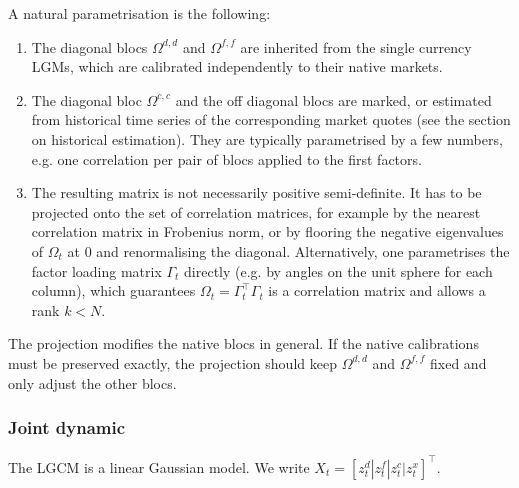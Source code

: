 \documentclass[11pt,english]{amsart}
\theoremstyle{definition}
\begin{document}
A natural parametrisation is the following:
\begin{enumerate}
\item The diagonal blocs $\Omega^{d,d}$ and $\Omega^{f,f}$ are inherited from the single currency LGMs, which are calibrated independently to their native markets.
\item The diagonal bloc $\Omega^{c,c}$ and the off diagonal blocs are marked, or estimated from historical time series of the corresponding market quotes (see the section on historical estimation). They are typically parametrised by a few numbers, e.g. one correlation per pair of blocs applied to the first factors.
\item The resulting matrix is not necessarily positive semi-definite. It has to be projected onto the set of correlation matrices, for example by the nearest correlation matrix in Frobenius norm, or by flooring the negative eigenvalues of $\Omega_t$ at $0$ and renormalising the diagonal. Alternatively, one parametrises the factor loading matrix $\Gamma_t$ directly (e.g. by angles on the unit sphere for each column), which guarantees $\Omega_t = \Gamma_t^\top\Gamma_t$ is a correlation matrix and allows a rank $k<N$.
\end{enumerate}
The projection modifies the native blocs in general. If the native calibrations must be preserved exactly, the projection should keep $\Omega^{d,d}$ and $\Omega^{f,f}$ fixed and only adjust the other blocs.



\subsubsection{Joint dynamic}%

The LGCM is a linear Gaussian model. We write $X_t = [z^d_t|z^f_t|z^c_t|z^x_t]^\top$.
\end{document}

